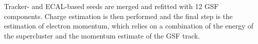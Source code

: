 Tracker- and ECAL-based seeds are merged and refitted with 12 GSF components.
Charge estimation is then performed and the final step is the estimation of electron momentum,
which relies on a combination of the energy of the supercluster and the momentum estimate of the GSF track.
